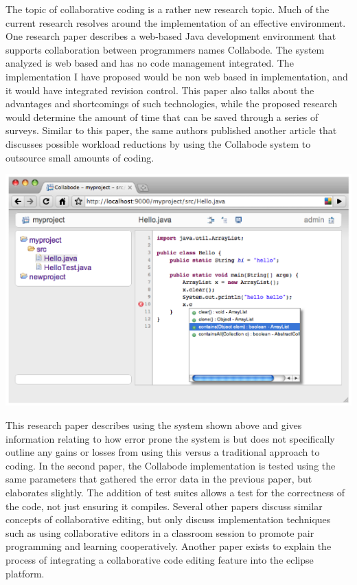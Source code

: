 \documentclass[11pt]{article}
\begin{document}
The topic of collaborative coding is a rather new research topic. Much of the current research resolves around the implementation of an effective environment. One research paper describes a web-based Java development environment that supports collaboration between programmers names Collabode.\cite{Goldman:2011:RCC:2047196.2047215} The system analyzed is web based and has no code management integrated. The implementation I have proposed would be non web based in implementation, and it would have integrated revision control. This paper also talks about the advantages and shortcomings of such technologies, while the proposed research would determine the amount of time that can be saved through a series of surveys. Similar to this paper, the same authors published another article that discusses possible workload reductions by using the Collabode system to outsource small amounts of coding. \cite{Goldman:2011:CCC:1984642.1984658} 

\includegraphics[scale=.7]{collabode}

This research paper describes using the system shown above and gives information relating to how error prone the system is but does not specifically outline any gains or losses from using this versus a traditional approach to coding. In the second paper, the Collabode implementation is tested using the same parameters that gathered the error data in the previous paper, but elaborates slightly. The addition of test suites allows a test for the correctness of the code, not just ensuring it compiles. \cite{Goldman:2011:RCC:2047196.2047215} Several other papers discuss similar concepts of collaborative editing, but only discuss implementation techniques such as using collaborative editors in a classroom session to promote pair programming and learning cooperatively. \cite{Hickey:2005:ECP:1040196.1040215} Another paper exists to explain the process of integrating a collaborative code editing feature into the eclipse platform. \cite{Waldmann:2010:IGW:1867651.1867671}
\end{document}

